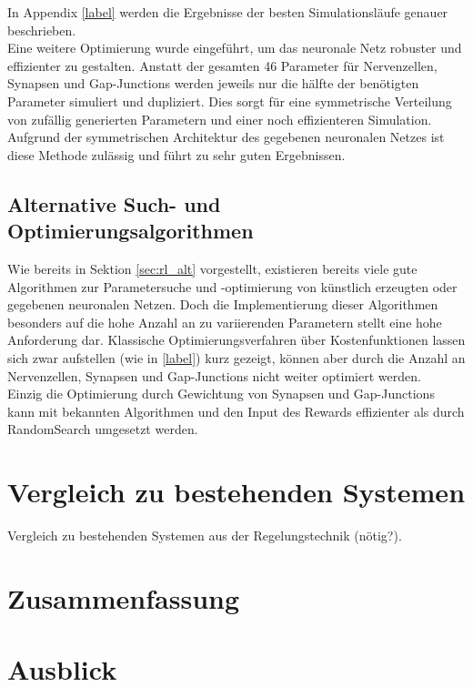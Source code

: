 		In Appendix \ref{label} werden die Ergebnisse der besten Simulationsläufe genauer beschrieben.\\
		Eine weitere Optimierung wurde eingeführt, um das neuronale Netz robuster und effizienter zu gestalten. Anstatt der gesamten 46 Parameter für Nervenzellen, Synapsen und Gap-Junctions werden jeweils nur die hälfte der benötigten Parameter simuliert und dupliziert. Dies sorgt für eine symmetrische Verteilung von zufällig generierten Parametern und einer noch effizienteren Simulation. Aufgrund der symmetrischen Architektur des gegebenen neuronalen Netzes ist diese Methode zulässig und führt zu sehr guten Ergebnissen.
	\subsection{Alternative Such- und Optimierungsalgorithmen}
		Wie bereits in Sektion \ref{sec:rl_alt} vorgestellt, existieren bereits viele gute Algorithmen zur Parametersuche und -optimierung von künstlich erzeugten oder gegebenen neuronalen Netzen. Doch die Implementierung dieser Algorithmen besonders auf die hohe Anzahl an zu variierenden Parametern stellt eine hohe Anforderung dar. Klassische Optimierungsverfahren über Kostenfunktionen lassen sich zwar aufstellen (wie in \ref{label}) kurz gezeigt, können aber durch die Anzahl an Nervenzellen, Synapsen und Gap-Junctions nicht weiter optimiert werden.\\
		Einzig die Optimierung durch Gewichtung von Synapsen und Gap-Junctions kann mit bekannten Algorithmen und den Input des Rewards effizienter als durch RandomSearch umgesetzt werden.

\section{Vergleich zu bestehenden Systemen}
\label{sec:erg_vgl}
	Vergleich zu bestehenden Systemen aus der Regelungstechnik (nötig?).

\section{Zusammenfassung}
\label{sec:erg_zsm}
	

\section{Ausblick}
\label{sec:erg_ausblick}

